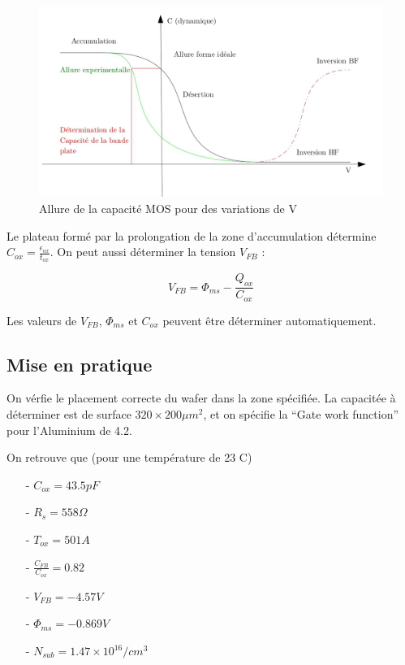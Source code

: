\documentclass[11pt]{article}
\begin{document}
\clearpage

\begin{figure}[!htb]
\centering
\includegraphics[scale=0.40]{allure_dynamique_MOS.jpg}
\caption{Allure de la capacit\'e MOS pour des variations de V}
\end{figure}

Le plateau form\'e par la prolongation de la zone d'accumulation d\'etermine $C_{ox} = \frac{\epsilon_{ox}}{t_{ox}}$. On peut aussi d\'eterminer la tension 
$V_{FB}$ :

\[
	V_{FB} = \Phi_{ms} - \frac{Q_{ox}}{C_{ox}}
\]

Les valeurs de $V_{FB}$, $\Phi_{ms}$ et $C_{ox}$ peuvent \^etre d\'eterminer automatiquement.

\subsection{Mise en pratique}
On v\'erfie le placement correcte du wafer dans la zone sp\'ecifi\'ee. La capacit\'ee \`a d\'eterminer est de surface $ 320 \times 200 \mu m^{2}$, et on sp\'ecifie la ``Gate work function'' pour l'Aluminium de 4.2.

On retrouve que (pour une temp\'erature de 23 C)
\begin{itemize}
\item[-] $C_{ox} = 43.5 pF$
\item[-] $R_s = 558 \Omega$
\item[-] $T_{ox} = 501 A$
\item[-] $\frac{C_{FB}}{C_{ox}} = 0.82$
\item[-] $V_{FB} = -4.57 V$
\item[-] $\Phi_{ms} = -0.869 V$
\item[-] $N_{sub} = 1.47 \times 10 ^{16} /cm^{3}$
\end{itemize}
\end{document}
